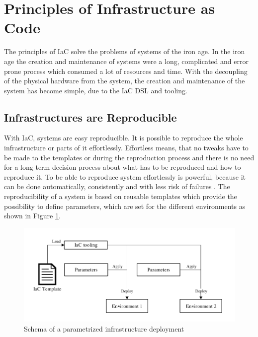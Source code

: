 \section{Principles of Infrastructure as Code}
\label{sec:iac-principles}
The principles of IaC solve the problems of systems of the iron age. In the iron age the creation and maintenance of systems were a long, complicated and error prone process which consumed a lot of resources and time. With the decoupling of the physical hardware from the system, the creation and maintenance of the system has become simple, due to the IaC DSL and tooling. 

\subsection{Infrastructures are Reproducible}
\label{sec:iac-principles-reproducibility}
With IaC, systems are easy reproducible. It is possible to reproduce the whole infrastructure or parts of it effortlessly. Effortless means, that no tweaks have to be made to the templates or during the reproduction process and there is no need for a long term decision process about what has to be reproduced and how to reproduce it. To be able to reproduce system effortlessly is powerful, because it can be done automatically, consistently and with less risk of failures \cite{Morris2016}. The reproducibility of a system is based on reusable templates which provide the possibility to define parameters, which are set for the different environments as shown in Figure \ref{fig:reproduce-infrastructure}.

\begin{figure}[htbp]
	\centering
	\includegraphics[scale=0.95]{images/reproduce-infrastructure.pdf}
	\caption{Schema of a parametrized infrastructure deployment}
	\label{fig:reproduce-infrastructure}
\end{figure} 

